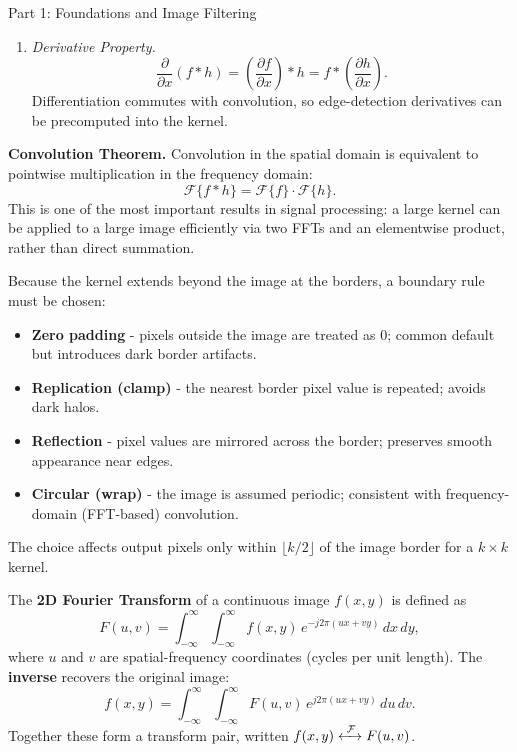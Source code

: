 \documentclass[letterpaper]{article}
\begin{document}
\begin{notes}{Part 1: Foundations and Image Filtering}
\begin{enumerate}
    \item \textit{Derivative Property.}
    $$\frac{\partial}{\partial x}(f * h) = \left(\frac{\partial f}{\partial x}\right) * h = f * \left(\frac{\partial h}{\partial x}\right).$$
    Differentiation commutes with convolution, so edge-detection derivatives can be precomputed into the kernel.
\end{enumerate}









\textbf{Convolution Theorem.}
Convolution in the spatial domain is equivalent to pointwise multiplication in the frequency domain:
$$\mathcal{F}\{f * h\} = \mathcal{F}\{f\} \cdot \mathcal{F}\{h\}.$$
This is one of the most important results in signal processing: a large kernel can be applied to a large image efficiently via two FFTs and an elementwise product, rather than direct summation.




Because the kernel extends beyond the image at the borders, a boundary rule must be chosen:
\begin{itemize}
    \item \textbf{Zero padding} - pixels outside the image are treated as 0; common default but introduces dark border artifacts.
    \item \textbf{Replication (clamp)} - the nearest border pixel value is repeated; avoids dark halos.
    \item \textbf{Reflection} - pixel values are mirrored across the border; preserves smooth appearance near edges.
    \item \textbf{Circular (wrap)} - the image is assumed periodic; consistent with frequency-domain (FFT-based) convolution.
\end{itemize}
The choice affects output pixels only within $\lfloor k/2\rfloor$ of the image border for a $k\times k$ kernel.






The \textbf{2D Fourier Transform} of a continuous image $f(x,y)$ is defined as
$$F(u,v) = \int_{-\infty}^{\infty}\int_{-\infty}^{\infty} f(x,y)\, e^{-j2\pi(ux+vy)}\, dx\, dy,$$
where $u$ and $v$ are spatial-frequency coordinates (cycles per unit length). The \textbf{inverse} recovers the original image:
$$f(x,y) = \int_{-\infty}^{\infty}\int_{-\infty}^{\infty} F(u,v)\, e^{j2\pi(ux+vy)}\, du\, dv.$$
Together these form a transform pair, written $f(x,y) \xleftrightarrow{\;\mathcal{F}\;} F(u,v)$.


\end{notes}
\end{document}
